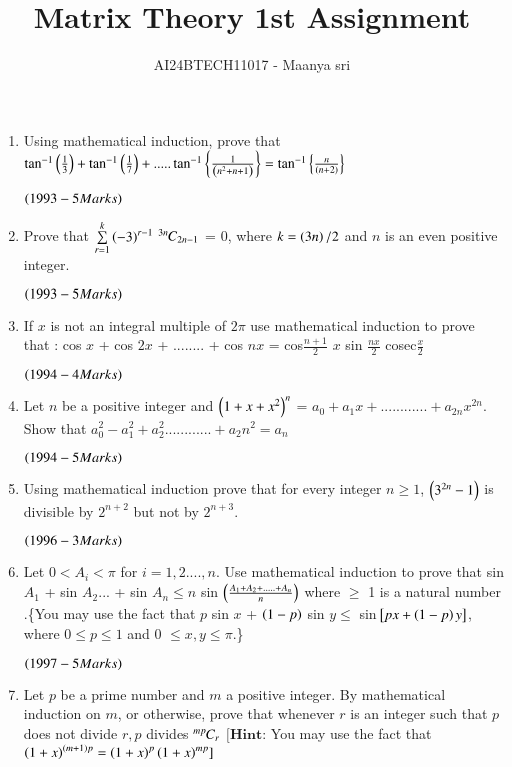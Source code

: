\documentclass[journal,12pt,twocolumn]{IEEEtran}
\theoremstyle{remark}
\begin{document}

\vspace{3cm}

\title{Matrix Theory 1st Assignment}
\author{AI24BTECH11017 - Maanya sri}
\maketitle
\newpage
\bigskip

\renewcommand{\thefigure}{\theenumi}
\renewcommand{\thetable}{\theenumi}\begin{enumerate}[start=16] 
	\item Using mathematical induction, prove that $\tan^{-1}\left(\frac{1}{3}\right)  +  \tan^{-1}\left(\frac{1}{7}\right) + .....\tan^{-1}\left\{\frac{1}{\left(n^2 + n + 1\right)}\right\} = \tan^{-1}\left\{\frac{n}{\left(n+2\right)}\right\}$ 

$\hfill\textcolor{black}{\brak{1993-5 Marks} }$
\item Prove that $\sum\limits^{k}_{r=1} \left(-3\right)^{r-1}$ ${{}^{3n}\mkern-1muC_{2n-1}}$ = $0$, where $k=\left(3n\right)/2$ and $n$ is an even positive integer.

$\hfill\textcolor{black}{\brak{1993-5 Marks} }$
\item If $x$ is not an integral multiple of $2\pi$ use mathematical induction to prove that : 
cos $x$ + cos $2x$ + ........ + cos $nx$ = cos$\frac{n+1}{2}$ $x$ sin $\frac{nx}{2}$ cosec$\frac{x}{2}$

$\hfill\textcolor{black}{\brak{1994-4 Marks}}$
\item 
Let $n$ be a positive integer and $\left(1+x+x^2\right)^n$ = $a_0 + a_1 x + ............+ a_{2n} x^{2n}$. Show that $a_0^2 - a_1^2 + a_2^2 ............ + a_2n^2 = a_n$

$\hfill\textcolor{black}{\brak{1994-5 Marks} }$
\item 
Using mathematical induction prove that for every integer $n \geq 1$, $\left(3^{2n} -1\right)$ is divisible by $2^{n+2}$ but not by $2^{n+3}$.

$\hfill\textcolor{black}{\brak{1996-3 Marks} }$
\item 
	Let $ 0<A_i<\pi$ for $i= 1,2....,n$. Use mathematical induction to prove that sin $A_1$ + sin $A_2$... + sin $A_n \leq  n$  sin $\left(\frac{A_1 + A_2 +.....+ A_n}{n}\right)$ where $\geq$ 1 is a natural number .\{You may use the fact that $p$ sin $x$ + $\left(1-p\right)$ sin $y\leq$ sin${}\left[px + \left(1-p\right)y\right]$, where $0 \leq p \leq 1 $ and 0 $\leq x,y \leq \pi $.\}

$\hfill\textcolor{black}{\brak{1997-5 Marks} }$\item 
Let $p$ be a prime number and $m$ a positive integer. By mathematical induction on $m$, or otherwise, prove that whenever $r$ is an integer such that $p$ does not divide $r , p$ divides ${{}^{mp}\mkern-1muC_{r}}$
		$[ \textbf{Hint:}$ You may use the fact that $\left(1+x\right)^{\left(m+1\right)p} = \left(1+x\right)^p\left(1+x\right)^ {mp}]$


\end{enumerate}
\end{document}
